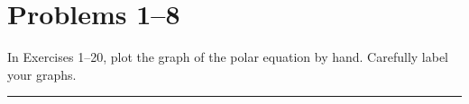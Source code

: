 \section{Problems 1--8}

In Exercises 1--20, plot the graph of the polar equation by hand. Carefully label your graphs. 

\medskip \hrule